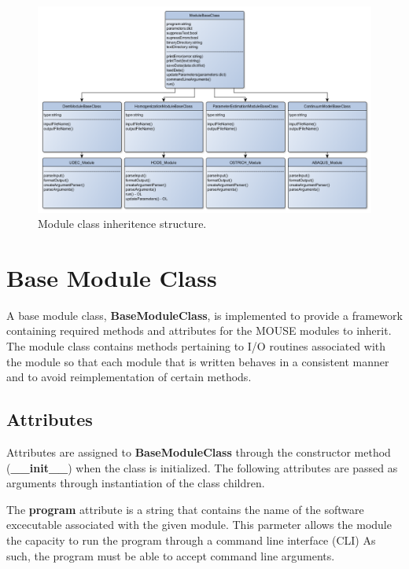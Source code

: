 \begin{figure}[!htb]
\begin{center}
\includegraphics[width=\textwidth]{figures/Chapter4/ModuleClassUML}
\caption{{\label{fig:moduleClass} Module class inheritence structure.%
}}
\end{center}
\end{figure}

\section{Base Module Class}

A base module class, \textbf{BaseModuleClass}, is implemented to provide a framework containing required methods and attributes for the MOUSE modules to inherit. The module class contains methods pertaining to I/O routines associated with the module so that each module that is written behaves in a consistent manner and to avoid reimplementation of certain methods. 

\subsection{Attributes}

Attributes are assigned to \textbf{BaseModuleClass} through the constructor method (\textbf{\_\_init\_\_}) when the class is initialized. The following attributes are passed as arguments through instantiation of the class children. 

The \textbf{program} attribute is a string that contains the name of the software excecutable associated with the given module. This parmeter allows the module the capacity to run the program through a command line interface (CLI) As such, the program must be able to accept command line arguments.


